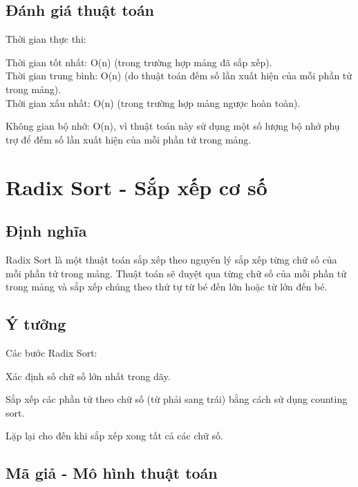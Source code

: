 \documentclass[12pt,a4paper]{report}
\begin{document}
\subsection{ Đánh giá thuật toán}

{Thời gian thực thi:

\hspace{0.5cm} Thời gian tốt nhất: O(n) (trong trường hợp mảng đã sắp xếp).\\

\hspace{0.5cm} Thời gian trung bình: O(n) (do thuật toán đếm số lần xuất hiện của mỗi phần tử trong mảng).\\

\hspace{0.5cm} Thời gian xấu nhất: O(n) (trong trường hợp mảng ngược hoàn toàn).\\}

{Không gian bộ nhớ: O(n), vì thuật toán này sử dụng một số lượng bộ nhớ phụ trợ để đếm số lần xuất hiện của mỗi phần tử trong mảng.}

\section{ Radix Sort - Sắp xếp cơ số}

\subsection{ Định nghĩa}

{\large \hspace{1cm} Radix Sort là một thuật toán sắp xếp theo nguyên lý sắp xếp từng chữ số của mỗi phần tử trong mảng. Thuật toán sẽ duyệt qua từng chữ số của mỗi phần tử trong mảng và sắp xếp chúng theo thứ tự từ bé đến lớn hoặc từ lớn đến bé.}

\subsection{ Ý tưởng}

Các bước Radix Sort:

Xác định số chữ số lớn nhất trong dãy.

Sắp xếp các phần tử theo chữ số (từ phải sang trái) bằng cách sử dụng counting sort.

Lặp lại cho đến khi sắp xếp xong tất cả các chữ số.

\subsection{ Mã giả - Mô hình thuật toán}
\end{document}
